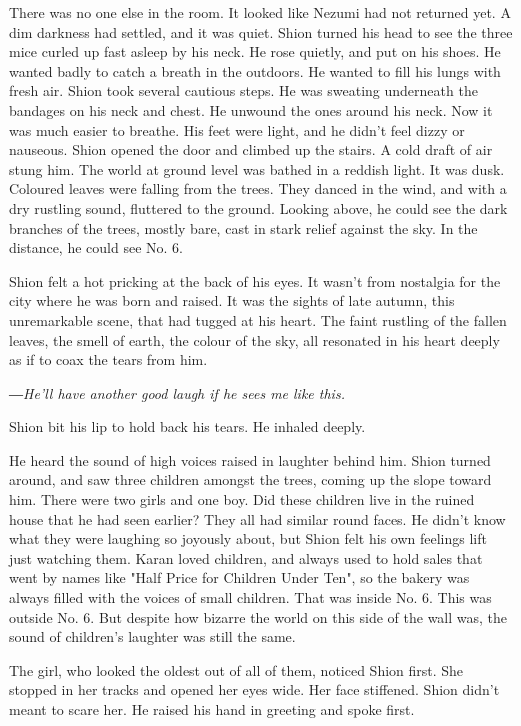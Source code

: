 There was no one else in the room. It looked like Nezumi had not
returned yet. A dim darkness had settled, and it was quiet. Shion turned
his head to see the three mice curled up fast asleep by his neck. He
rose quietly, and put on his shoes. He wanted badly to catch a breath in
the outdoors. He wanted to fill his lungs with fresh air. Shion took
several cautious steps. He was sweating underneath the bandages on his
neck and chest. He unwound the ones around his neck. Now it was much
easier to breathe. His feet were light, and he didn't feel dizzy or
nauseous. Shion opened the door and climbed up the stairs. A cold draft
of air stung him. The world at ground level was bathed in a reddish
light. It was dusk. Coloured leaves were falling from the trees. They
danced in the wind, and with a dry rustling sound, fluttered to the
ground. Looking above, he could see the dark branches of the trees,
mostly bare, cast in stark relief against the sky. In the distance, he
could see No. 6.

Shion felt a hot pricking at the back of his eyes. It wasn't from
nostalgia for the city where he was born and raised. It was the sights
of late autumn, this unremarkable scene, that had tugged at his heart.
The faint rustling of the fallen leaves, the smell of earth, the colour
of the sky, all resonated in his heart deeply as if to coax the tears
from him.

\emph{―He'll have another good laugh if he sees me like this.}

Shion bit his lip to hold back his tears. He inhaled deeply.

He heard the sound of high voices raised in laughter behind him. Shion
turned around, and saw three children amongst the trees, coming up the
slope toward him. There were two girls and one boy. Did these children
live in the ruined house that he had seen earlier? They all had similar
round faces. He didn't know what they were laughing so joyously about,
but Shion felt his own feelings lift just watching them. Karan loved
children, and always used to hold sales that went by names like "Half
Price for Children Under Ten", so the bakery was always filled with the
voices of small children. That was inside No. 6. This was outside No. 6.
But despite how bizarre the world on this side of the wall was, the
sound of children's laughter was still the same.

The girl, who looked the oldest out of all of them, noticed Shion first.
She stopped in her tracks and opened her eyes wide. Her face stiffened.
Shion didn't meant to scare her. He raised his hand in greeting and
spoke first.

